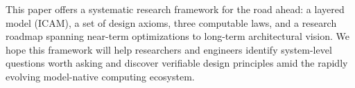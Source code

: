 \documentclass[11pt,a4paper]{article}
\newcounter{axiom}[section]
\begin{document}
This paper offers a systematic research framework for the road ahead: a layered model (ICAM), a set of design axioms, three computable laws, and a research roadmap spanning near-term optimizations to long-term architectural vision. We hope this framework will help researchers and engineers identify system-level questions worth asking and discover verifiable design principles amid the rapidly evolving model-native computing ecosystem.




\end{document}
